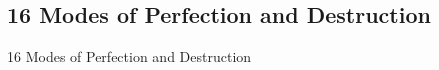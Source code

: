 \subsection{16 Modes of Perfection and Destruction}
\begin{frame}[t]{16 Modes of Perfection and Destruction}


\end{frame}
